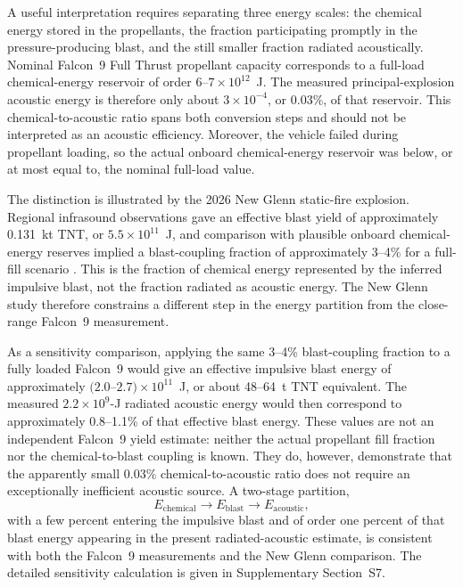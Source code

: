 \documentclass[]{seismica}
\begin{document}
A useful interpretation requires separating three energy scales:
the chemical energy stored in the propellants, the fraction participating
promptly in the pressure-producing blast, and the still smaller fraction
radiated acoustically. Nominal Falcon~9 Full Thrust propellant capacity
corresponds to a full-load chemical-energy reservoir of order
$6$--$7\times10^{12}$~J. The measured principal-explosion acoustic energy is
therefore only about $3\times10^{-4}$, or 0.03\%, of that reservoir. This
chemical-to-acoustic ratio spans both conversion steps and should not be
interpreted as an acoustic efficiency. Moreover, the vehicle failed during
propellant loading, so the actual onboard chemical-energy reservoir was below,
or at most equal to, the nominal full-load value.

The distinction is illustrated by the 2026 New Glenn static-fire explosion.
Regional infrasound observations gave an effective blast yield of approximately
0.131~kt TNT, or $5.5\times10^{11}$~J, and comparison with plausible onboard
chemical-energy reserves implied a blast-coupling fraction of approximately
3--4\% for a full-fill scenario \citep{silber_scamfer_newglenn_2026}. This
is the fraction of chemical energy represented by the inferred impulsive blast,
not the fraction radiated as acoustic energy. The New Glenn study therefore
constrains a different step in the energy partition from the close-range
Falcon~9 measurement.

As a sensitivity comparison, applying the same 3--4\% blast-coupling fraction
to a fully loaded Falcon~9 would give an effective impulsive blast energy of
approximately $(2.0$--$2.7)\times10^{11}$~J, or about 48--64~t TNT
equivalent. The measured $2.2\times10^9$-J radiated acoustic energy would then
correspond to approximately 0.8--1.1\% of that effective blast energy. These
values are not an independent Falcon~9 yield estimate: neither the actual
propellant fill fraction nor the chemical-to-blast coupling is known. They do,
however, demonstrate that the apparently small 0.03\% chemical-to-acoustic
ratio does not require an exceptionally inefficient acoustic source. A
two-stage partition,
\[
 E_{\mathrm{chemical}}
 \rightarrow E_{\mathrm{blast}}
 \rightarrow E_{\mathrm{acoustic}},
\]
with a few percent entering the impulsive blast and of order one percent of
that blast energy appearing in the present radiated-acoustic estimate, is
consistent with both the Falcon~9 measurements and the New Glenn comparison.
The detailed sensitivity calculation is given in Supplementary Section~S7.
\end{document}
